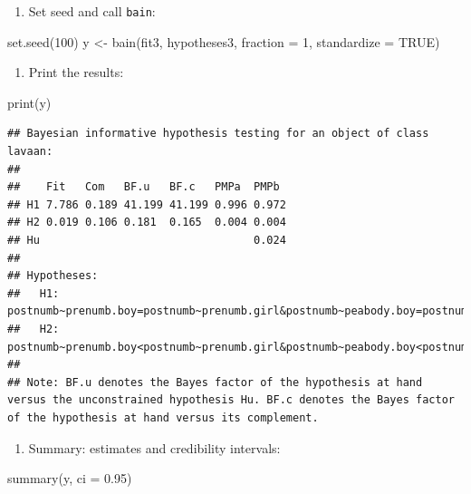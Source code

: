 \documentclass[
]{book}
\newenvironment{Shaded}{\begin{snugshade}}{\end{snugshade}}
\newcommand{\AttributeTok}[1]{\textcolor[rgb]{0.77,0.63,0.00}{#1}}
\newcommand{\ConstantTok}[1]{\textcolor[rgb]{0.00,0.00,0.00}{#1}}
\newcommand{\DecValTok}[1]{\textcolor[rgb]{0.00,0.00,0.81}{#1}}
\newcommand{\FloatTok}[1]{\textcolor[rgb]{0.00,0.00,0.81}{#1}}
\newcommand{\FunctionTok}[1]{\textcolor[rgb]{0.00,0.00,0.00}{#1}}
\newcommand{\NormalTok}[1]{#1}
\newcommand{\OtherTok}[1]{\textcolor[rgb]{0.56,0.35,0.01}{#1}}
\providecommand{\tightlist}{%
  \setlength{\itemsep}{0pt}\setlength{\parskip}{0pt}}
\begin{document}
\begin{enumerate}
\def\labelenumi{\arabic{enumi})}
\setcounter{enumi}{2}
\tightlist
\item
  Set seed and call \texttt{bain}:
\end{enumerate}

\begin{Shaded}
\begin{Highlighting}[]
\FunctionTok{set.seed}\NormalTok{(}\DecValTok{100}\NormalTok{)}
\NormalTok{y }\OtherTok{\textless{}{-}} \FunctionTok{bain}\NormalTok{(fit3, hypotheses3, }\AttributeTok{fraction =} \DecValTok{1}\NormalTok{, }\AttributeTok{standardize =} \ConstantTok{TRUE}\NormalTok{)}
\end{Highlighting}
\end{Shaded}

\begin{enumerate}
\def\labelenumi{\arabic{enumi})}
\setcounter{enumi}{3}
\tightlist
\item
  Print the results:
\end{enumerate}

\begin{Shaded}
\begin{Highlighting}[]
\FunctionTok{print}\NormalTok{(y)}
\end{Highlighting}
\end{Shaded}

\begin{verbatim}
## Bayesian informative hypothesis testing for an object of class lavaan:
## 
##    Fit   Com   BF.u   BF.c   PMPa  PMPb 
## H1 7.786 0.189 41.199 41.199 0.996 0.972
## H2 0.019 0.106 0.181  0.165  0.004 0.004
## Hu                                 0.024
## 
## Hypotheses:
##   H1: postnumb~prenumb.boy=postnumb~prenumb.girl&postnumb~peabody.boy=postnumb~peabody.girl
##   H2: postnumb~prenumb.boy<postnumb~prenumb.girl&postnumb~peabody.boy<postnumb~peabody.girl
## 
## Note: BF.u denotes the Bayes factor of the hypothesis at hand versus the unconstrained hypothesis Hu. BF.c denotes the Bayes factor of the hypothesis at hand versus its complement.
\end{verbatim}

\begin{enumerate}
\def\labelenumi{\arabic{enumi})}
\setcounter{enumi}{4}
\tightlist
\item
  Summary: estimates and credibility intervals:
\end{enumerate}

\begin{Shaded}
\begin{Highlighting}[]
\FunctionTok{summary}\NormalTok{(y, }\AttributeTok{ci =} \FloatTok{0.95}\NormalTok{)}
\end{Highlighting}
\end{Shaded}
\end{document}
